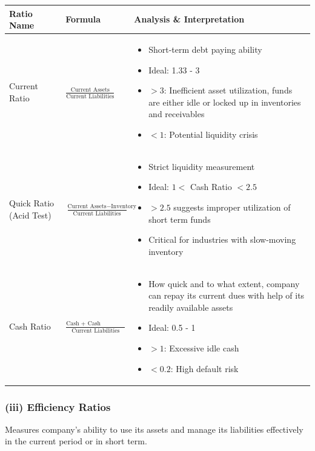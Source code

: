 \documentclass[12pt]{article}
\begin{document}
\renewcommand{\arraystretch}{1.5}
\begin{longtable}{|>{\raggedright\arraybackslash}m{4.5cm}|>{\raggedright\arraybackslash}m{5cm}|>{\raggedright\arraybackslash}m{6cm}|}
\hline
\textbf{Ratio Name} & \textbf{Formula} & \textbf{Analysis \& Interpretation} \\
\hline
Current Ratio & 
$\frac{\text{Current Assets}}{\text{Current Liabilities}}$ &
\begin{itemize}
\item Short-term debt paying ability
\item Ideal: 1.33 - 3 
\item $>3$: Inefficient asset utilization, funds are either idle or locked up in inventories and receivables
\item $<1$: Potential liquidity crisis
\end{itemize} \\
\hline

Quick Ratio (Acid Test) & 
$\frac{\text{Current Assets} - \text{Inventory}}{\text{Current Liabilities}}$ &
\begin{itemize}
\item Strict liquidity measurement
\item Ideal: $1<$ Cash Ratio $<2.5$
\item $>2.5$ suggests improper utilization of short term funds
\item Critical for industries with slow-moving inventory
\end{itemize} \\
\hline

Cash Ratio & 
$\frac{\text{Cash + Cash Equivalents}}{\text{Current Liabilities}}$ &
\begin{itemize}
\item How quick and to what extent, company can repay its current dues with help of its readily available assets
\item Ideal: 0.5 - 1
\item $>1$: Excessive idle cash
\item $<0.2$: High default risk
\end{itemize} \\
\hline
\end{longtable}

\subsubsection*{(iii) Efficiency Ratios}

Measures company's ability to use its assets and manage its liabilities effectively in the current period or in short term.
\end{document}
